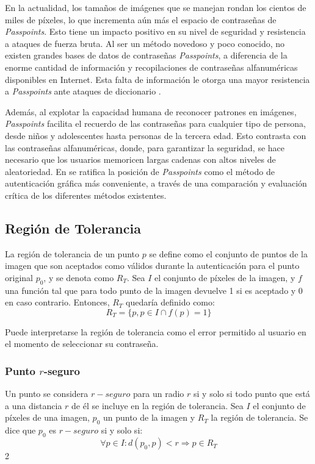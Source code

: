 En la actualidad, los tamaños de imágenes que se manejan rondan los cientos de miles de píxeles, lo que incrementa aún más el espacio de contraseñas de \textit{Passpoints}. Esto tiene un impacto positivo en su nivel de seguridad y resistencia a ataques de fuerza bruta. Al ser un método novedoso y poco conocido, no existen grandes bases de datos de contraseñas \textit{Passpoints}, a diferencia de la enorme cantidad de información y recopilaciones de contraseñas alfanuméricas disponibles en Internet. Esta falta de información le otorga una mayor resistencia a \textit{Passpoints} ante ataques de diccionario \cite{weakpassw}.

Además, al explotar la capacidad humana de reconocer patrones en imágenes, \textit{Passpoints} facilita el recuerdo de las contraseñas para cualquier tipo de persona, desde niños y adolescentes hasta personas de la tercera edad. Esto contrasta con las contraseñas alfanuméricas, donde, para garantizar la seguridad, se hace necesario que los usuarios memoricen largas cadenas con altos niveles de aleatoriedad. En \cite{rodriguez2018seguridad} se ratifica la posición de \textit{Passpoints} como el método de autenticación gráfica más conveniente, a través de una comparación y evaluación crítica de los diferentes métodos existentes.

\subsection{Región de Tolerancia}
La región de tolerancia \cite{legon2019nuevo, borrego2018debilidades} de un punto \(p\) se define como el conjunto de puntos de la imagen que son aceptados como válidos durante la autenticación para el punto original \(p_0\), y se denota como \(R_T\). Sea \(I\) el conjunto de píxeles de la imagen, y \(f\) una función tal que para todo punto de la imagen devuelve 1 si es aceptado y 0 en caso contrario. Entonces, \(R_T\) quedaría definido como:
\begin{equation}
	R_T = \{p, p \in I \cap f(p) = 1\} \label{eq:region_tolerancia}
\end{equation}

Puede interpretarse la región de tolerancia como el error permitido al usuario en el momento de seleccionar su contraseña.

\subsubsection{Punto \texorpdfstring{$r$}{r}-seguro}
Un punto se considera $r-seguro$ \cite{legon2019nuevo,  borrego2018debilidades} para un radio \(r\) si y solo si todo punto que está a una distancia \(r\) de él se incluye en la región de tolerancia. Sea \(I\) el conjunto de píxeles de una imagen, \(p_0\) un punto de la imagen y \(R_T\) la región de tolerancia. Se dice que \(p_0\) es $r-seguro$ si y solo si:
\begin{equation}
	\forall p \in I: d(p_0, p) < r \Rightarrow p \in R_T \label{eq:r_seguro}
\end{equation}2
		
